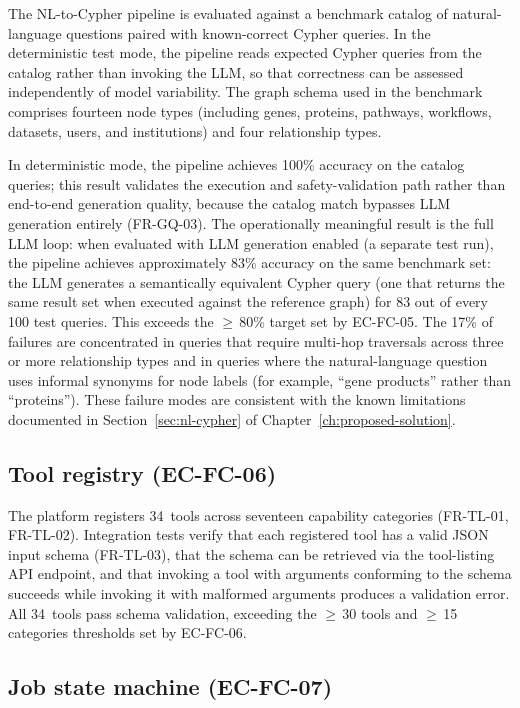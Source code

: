 \documentclass[a4paper]{sapthesis}
\begin{document}
The NL-to-Cypher pipeline is evaluated against a benchmark catalog of
natural-language questions paired with known-correct Cypher queries.  In
the deterministic test mode, the pipeline reads expected Cypher queries
from the catalog rather than invoking the LLM, so that correctness can
be assessed independently of model variability.  The graph schema used
in the benchmark comprises fourteen node types (including genes,
proteins, pathways, workflows, datasets, users, and institutions) and
four relationship types.

In deterministic mode, the pipeline achieves 100\% accuracy on the
catalog queries; this result validates the execution and safety-validation
path rather than end-to-end generation quality, because the catalog match
bypasses LLM generation entirely (FR-GQ-03).  The operationally meaningful
result is the full LLM loop: when evaluated with LLM generation enabled
(a separate test run), the pipeline achieves approximately 83\% accuracy
on the same benchmark set: the LLM generates a semantically equivalent
Cypher query (one that returns the same result set when executed against
the reference graph) for 83 out of every 100 test queries.  This
exceeds the $\geq$\,80\% target set by EC-FC-05.  The 17\% of
failures are concentrated in queries that require multi-hop traversals
across three or more relationship types and in queries where the
natural-language question uses informal synonyms for node labels (for
example, ``gene products'' rather than ``proteins'').  These failure
modes are consistent with the known limitations documented in
Section~\ref{sec:nl-cypher} of Chapter~\ref{ch:proposed-solution}.

\subsection{Tool registry (EC-FC-06)}

The platform registers 34~tools across seventeen capability categories
(FR-TL-01, FR-TL-02).  Integration tests verify that each registered
tool has a valid JSON input schema (FR-TL-03), that the schema can be
retrieved via the tool-listing API endpoint, and that invoking a tool
with arguments conforming to the schema succeeds while invoking it with
malformed arguments produces a validation error.  All 34~tools pass
schema validation, exceeding the $\geq$\,30 tools and $\geq$\,15
categories thresholds set by EC-FC-06.

\subsection{Job state machine (EC-FC-07)}
\end{document}
